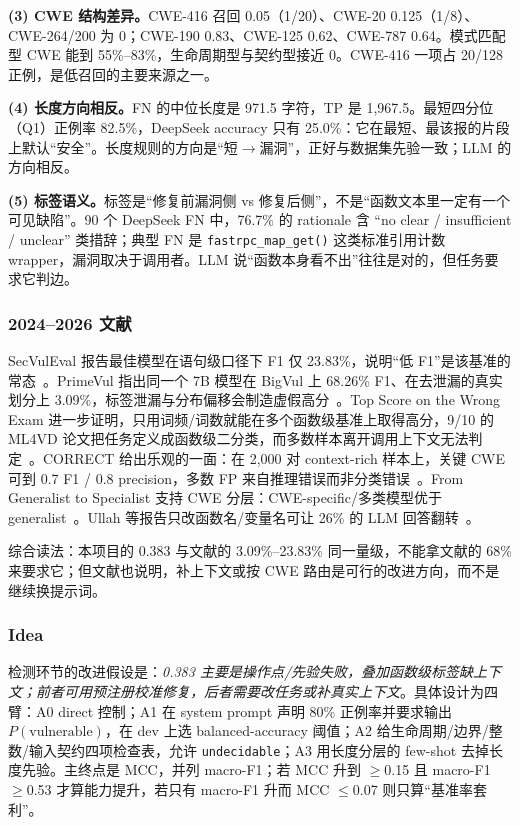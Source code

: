 \documentclass[conference]{IEEEtran}
\begin{document}
\textbf{(3) CWE 结构差异。}CWE-416 召回 0.05（1/20）、CWE-20 0.125（1/8）、CWE-264/200 为 0；CWE-190 0.83、CWE-125 0.62、CWE-787 0.64。模式匹配型 CWE 能到 55\%--83\%，生命周期型与契约型接近 0。CWE-416 一项占 20/128 正例，是低召回的主要来源之一。

\textbf{(4) 长度方向相反。}FN 的中位长度是 971.5 字符，TP 是 1,967.5。最短四分位（Q1）正例率 82.5\%，DeepSeek accuracy 只有 25.0\%：它在最短、最该报的片段上默认“安全”。长度规则的方向是“短$\to$漏洞”，正好与数据集先验一致；LLM 的方向相反。

\textbf{(5) 标签语义。}标签是“修复前漏洞侧 vs 修复后侧”，不是“函数文本里一定有一个可见缺陷”。90 个 DeepSeek FN 中，76.7\% 的 rationale 含 “no clear / insufficient / unclear” 类措辞；典型 FN 是 \texttt{fastrpc\_map\_get()} 这类标准引用计数 wrapper，漏洞取决于调用者。LLM 说“函数本身看不出”往往是对的，但任务要求它判边。

\subsubsection{2024--2026 文献}

SecVulEval 报告最佳模型在语句级口径下 F1 仅 23.83\%，说明“低 F1”是该基准的常态~\cite{ahmed2026secvuleval}。PrimeVul 指出同一个 7B 模型在 BigVul 上 68.26\% F1、在去泄漏的真实划分上 3.09\%，标签泄漏与分布偏移会制造虚假高分~\cite{ding2025primevul}。Top Score on the Wrong Exam 进一步证明，只用词频/词数就能在多个函数级基准上取得高分，9/10 的 ML4VD 论文把任务定义成函数级二分类，而多数样本离开调用上下文无法判定~\cite{risse2025topscore}。CORRECT 给出乐观的一面：在 2{,}000 对 context-rich 样本上，关键 CWE 可到 0.7 F1 / 0.8 precision，多数 FP 来自推理错误而非分类错误~\cite{li2025correct}。From Generalist to Specialist 支持 CWE 分层：CWE-specific/多类模型优于 generalist~\cite{alatiq2024specialist}。Ullah 等报告只改函数名/变量名可让 26\% 的 LLM 回答翻转~\cite{ull2024}。

综合读法：本项目的 0.383 与文献的 3.09\%--23.83\% 同一量级，不能拿文献的 68\% 来要求它；但文献也说明，补上下文或按 CWE 路由是可行的改进方向，而不是继续换提示词。

\subsubsection{Idea}

检测环节的改进假设是：\emph{0.383 主要是操作点/先验失败，叠加函数级标签缺上下文；前者可用预注册校准修复，后者需要改任务或补真实上下文}。具体设计为四臂：A0 direct 控制；A1 在 system prompt 声明 80\% 正例率并要求输出 $P(\text{vulnerable})$，在 dev 上选 balanced-accuracy 阈值；A2 给生命周期/边界/整数/输入契约四项检查表，允许 \texttt{undecidable}；A3 用长度分层的 few-shot 去掉长度先验。主终点是 MCC，并列 macro-F1；若 MCC 升到 $\ge$0.15 且 macro-F1 $\ge$0.53 才算能力提升，若只有 macro-F1 升而 MCC $\le$0.07 则只算“基准率套利”。
\end{document}
